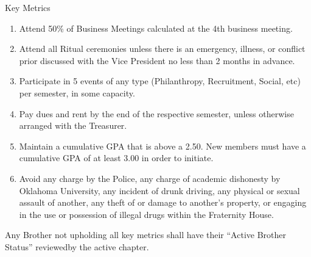 \documentclass{article}
\begin{document}
Key Metrics

\begin{enumerate}
    \item Attend 50\% of Business Meetings calculated at the 4th business meeting.
    \item Attend all Ritual ceremonies unless there is an emergency, illness, or conflict prior discussed with the Vice President no less than 2 months in advance.
    \item Participate in 5 events of any type (Philanthropy, Recruitment, Social, etc) per semester, in some capacity.
    \item Pay dues and rent by the end of the respective semester, unless otherwise arranged with the Treasurer.
    \item Maintain a cumulative GPA that is above a 2.50. New members must have a cumulative GPA of at least 3.00 in order to initiate.
    \item Avoid any charge by the Police, any charge of academic dishonesty by Oklahoma University, any incident of drunk driving, any physical or sexual assault of another, any theft of or damage to another’s property, or engaging in the use or possession of illegal drugs within the Fraternity House.
\end{enumerate}

Any Brother not upholding all key metrics shall have their “Active Brother Status” reviewed\footnotemark by the active chapter.

\end{document}

